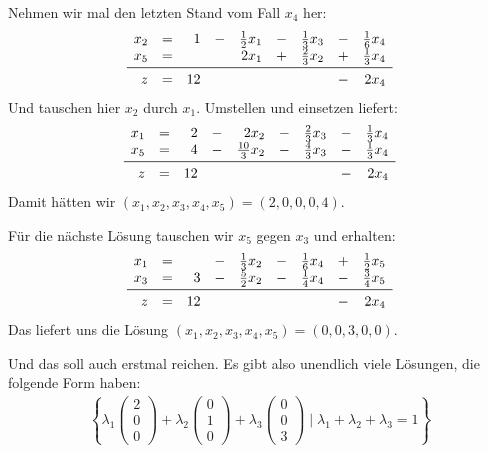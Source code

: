 \documentclass[
a4paper, %
11pt,
]
{scrartcl}
\begin{document}
Nehmen wir mal den letzten Stand vom Fall $x_4$ her:
\begin{align*}
  \begin{array}{rcrcrcrcr}
    x_2      & = & 1  & - & \frac{1}{2} x_1 & - & \frac{1}{3} x_3 & - & \frac{1}{6} x_4\\
    x_5      & = &    &   & 2 x_1           & + & \frac{2}{3} x_2 & + & \frac{1}{3} x_4\\
    \midrule
    z        & = & 12 &   &                 &   &                 & - & 2 x_4
  \end{array}
\end{align*}
Und tauschen hier $x_2$ durch $x_1$. Umstellen und einsetzen liefert:
\begin{align*}
  \begin{array}{rcrcrcrcr}
    x_1 & = & 2 & - & 2 x_2            & - & \frac{2}{3} x_3 & - & \frac{1}{3} x_4\\
    x_5 & = & 4 & - & \frac{10}{3} x_2 & - & \frac{4}{3} x_3 & - & \frac{1}{3} x_4\\
    \midrule
    z        & = & 12 &   &       &   &                 & - & 2 x_4
  \end{array}
\end{align*}
Damit hätten wir $(x_1, x_2, x_3, x_4, x_5) = (2, 0, 0, 0, 4)$.

Für die nächste Lösung tauschen wir $x_5$ gegen $x_3$ und erhalten:
\begin{align*}
  \begin{array}{rcrcrcrcr}
    x_1      & = &    & - & \frac{1}{3} x_2 & - & \frac{1}{6} x_4 & + & \frac{1}{2} x_5\\
    x_3      & = & 3  & - & \frac{5}{2} x_2 & - & \frac{1}{4} x_4 & - & \frac{3}{4} x_5\\
    \midrule
    z        & = & 12 &   &                 &   &                 & - & 2 x_4
  \end{array}
\end{align*}
Das liefert uns die Lösung $(x_1, x_2, x_3, x_4, x_5) = (0, 0, 3, 0, 0)$.

Und das soll auch erstmal reichen. Es gibt also unendlich viele Lösungen, die
folgende Form haben:
\begin{align*}
  \left\{
    \lambda_1
    \begin{pmatrix}
      2\\
      0\\
      0
    \end{pmatrix}
    +
    \lambda_2
    \begin{pmatrix}
      0\\
      1\\
      0
    \end{pmatrix}
    +
    \lambda_3
    \begin{pmatrix}
      0\\
      0\\
      3
    \end{pmatrix}
    \mid
    \lambda_1 + \lambda_2 + \lambda_3 = 1
  \right\}
\end{align*}
\end{document}

